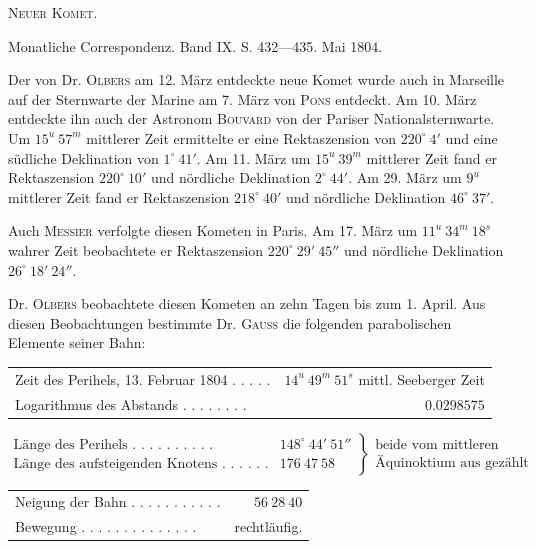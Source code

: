 \centerline{\textsc{Neuer Komet.}}

\medskip
Monatliche Correspondenz. Band IX. S. 432---435. Mai 1804.

\medskip
Der von Dr. \textsc{Olbers} am 12. März entdeckte neue Komet wurde auch in Marseille auf der Sternwarte der Marine am 7. März von \textsc{Pons} entdeckt. Am 10. März entdeckte ihn auch der Astronom \textsc{Bouvard} von der Pariser Nationalsternwarte. Um $15^u\ 57^m$ mittlerer Zeit ermittelte er eine Rektaszension von $220^\circ\ 4'$ und eine südliche Deklination von $1^\circ\ 41'$. Am 11. März um $15^u\ 39^m$ mittlerer Zeit fand er Rektaszension $220^\circ\ 10'$ und nördliche Deklination $2^\circ\ 44'$. Am 29. März um $9^u$ mittlerer Zeit fand er Rektaszension $218^\circ\ 40'$ und nördliche Deklination $46^\circ\ 37'$.

Auch \textsc{Messier} verfolgte diesen Kometen in Paris. Am 17. März um $11^u\ 34^m\ 18^s$ wahrer Zeit beobachtete er Rektaszension $220^\circ\ 29'\ 45''$ und nördliche Deklination $26^\circ\ 18'\ 24''$.

Dr. \textsc{Olbers} beobachtete diesen Kometen an zehn Tagen bis zum 1. April. Aus diesen Beobachtungen bestimmte Dr. \textsc{Gauss} die folgenden parabolischen Elemente seiner Bahn:

\begin{center}
\begingroup\fontsize{9}{11}\selectfont\setlength{\tabcolsep}{3pt}
\begin{tabular}{lr}
Zeit des Perihels, 13. Februar 1804 . . . . . & $14^u\ 49^m\ 51^s$ mittl. Seeberger Zeit \\
Logarithmus des Abstands . . . . . . . . & $0.0298575$ \\
\end{tabular}\endgroup
\end{center}
{\fontsize{8}{10}\selectfont
\[\left.\begin{array}{ll}\text{Länge des Perihels . . . . . . . . . .}&148^\circ\ 44'\ 51''\\\text{Länge des aufsteigenden Knotens . . . . . .}&176\ 47\ 58\end{array}\right\}\begin{array}{l}\text{beide vom mittleren}\\\text{Äquinoktium aus gezählt}\end{array}\]}
\begin{center}
\begingroup\fontsize{9}{11}\selectfont\setlength{\tabcolsep}{3pt}
\begin{tabular}{lr}
Neigung der Bahn . . . . . . . . . . . & $56\ 28\ 40$ \\
Bewegung . . . . . . . . . . . . . . & rechtläufig. \\
\end{tabular}\endgroup
\end{center}

